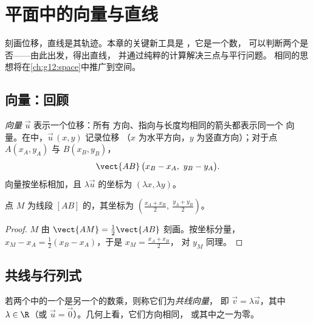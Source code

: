 \chapter{平面中的向量与直线}\label{ch:g11:vect}

刻画位移，直线是其轨迹。本章的关键新工具是
\emph{}，它是一个数，
可以判断两个是否——由此出发，得出直线，
并通过纯粹的计算解决三点与平行问题。
相同的思想将在\cref{ch:g12:space}中推广到空间。

\section{向量：回顾}

\begin{definition}[向量，坐标]\label{def:g11:vect:vector}
\emph{向量} $\vec u$ 表示一个位移：所有
方向、指向与长度均相同的箭头都表示同一个
向量。在中，$\vec u\,(x, y)$ 记录位移
（$x$ 为水平方向，$y$ 为竖直方向）；对于点 $A(x_A, y_A)$ 与
$B(x_B, y_B)$，
\[
\vect{AB}\,\bigl(x_B - x_A,\ y_B - y_A\bigr).
\]
向量按坐标相加，且 $\lambda\vec u$ 的坐标为
$(\lambda x, \lambda y)$。
\end{definition}

\begin{proposition}[中点]\label{prop:g11:vect:midpoint}
点 $M$ 为线段 $[AB]$ 的，其坐标为
$\left(\frac{x_A + x_B}{2},\ \frac{y_A + y_B}{2}\right)$。
\end{proposition}

\begin{proof}
$M$ 由 $\vect{AM} = \frac12\vect{AB}$ 刻画。按坐标分量，
$x_M - x_A = \frac12(x_B - x_A)$，于是 $x_M = \frac{x_A + x_B}{2}$，
对 $y_M$ 同理。
\end{proof}

\section{共线与行列式}

\begin{definition}[共线向量]\label{def:g11:vect:collinear}
若两个中的一个是另一个的数乘，则称它们为\emph{共线向量}，
即 $\vec v = \lambda \vec u$，其中
$\lambda \in \R$（或 $\vec u = \vec 0$）。几何上看，它们方向相同，
或其中之一为零。
\end{definition}

